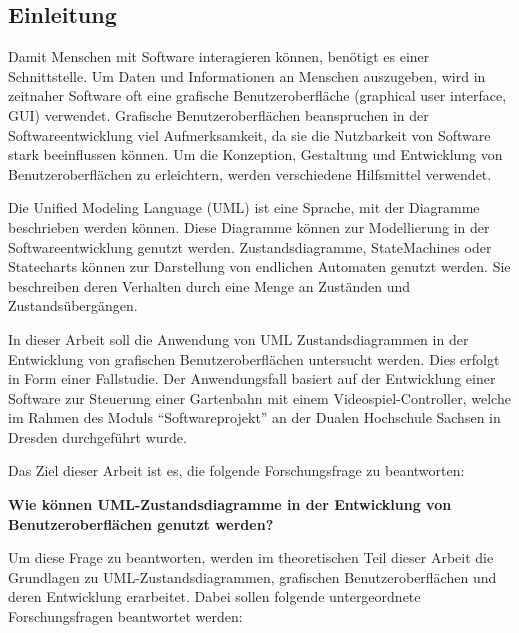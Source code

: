 \documentclass[first=Christoph,last=Hoentzsch,company=Softwareprojekt,location=Dresden,simple, noheader]{baarticle}
\begin{document}
\begin{basimple}[
        img=images/logo.png,
        course=Wirtschaftsinformatik,
        title={Nutzung von Zustandsdiagrammen zur Modellierung von Benutzeroberflächenelementen - eine Fallstudie},
        number=3005551,
        corrector={Prof. Dr. Steffen Greiffenberg},
        themedate={17.12.2025},
        returndate={17.12.2025},
        signature=images/signature.png,
        location=Dresden,
        type=study,
        blocknotice=false,
    ]
    \section{Einleitung} \label{sec:intro}
        Damit Menschen mit Software interagieren können, benötigt es einer Schnittstelle. 
        Um Daten und Informationen an Menschen auszugeben, wird in zeitnaher Software oft eine grafische Benutzeroberfläche (graphical user interface, \gls{GUI}) verwendet.
        Grafische Benutzeroberflächen beanspruchen in der Softwareentwicklung viel Aufmerksamkeit, da sie die Nutzbarkeit von Software stark beeinflussen können.
        Um die Konzeption, Gestaltung und Entwicklung von Benutzeroberflächen zu erleichtern, werden verschiedene Hilfsmittel verwendet. 

        Die Unified Modeling Language (\gls{UML}) ist eine Sprache, mit der Diagramme beschrieben werden können.
        Diese Diagramme können zur Modellierung in der Softwareentwicklung genutzt werden.
        Zustandsdiagramme, StateMachines oder Statecharts können zur Darstellung von endlichen Automaten genutzt werden.
        Sie beschreiben deren Verhalten durch eine Menge an Zuständen und Zustandsübergängen.
        
        In dieser Arbeit soll die Anwendung von \gls{UML} Zustandsdiagrammen in der Entwicklung von grafischen Benutzeroberflächen untersucht werden.
        Dies erfolgt in Form einer Fallstudie.
        Der Anwendungsfall basiert auf der Entwicklung einer Software zur Steuerung einer Gartenbahn mit einem Videospiel-Controller, welche im Rahmen des Moduls \enquote{Softwareprojekt} an der Dualen Hochschule Sachsen in Dresden durchgeführt wurde.

        Das Ziel dieser Arbeit ist es, die folgende Forschungsfrage zu beantworten: 

        \textbf{Wie können \gls{UML}-Zustandsdiagramme in der Entwicklung von Benutzeroberflächen genutzt werden?}

        Um diese Frage zu beantworten, werden im theoretischen Teil dieser Arbeit die Grundlagen zu \gls{UML}-Zustandsdiagrammen, grafischen Benutzeroberflächen und deren Entwicklung erarbeitet. 
        Dabei sollen folgende untergeordnete Forschungsfragen beantwortet werden:


\end{basimple}
\end{document}
